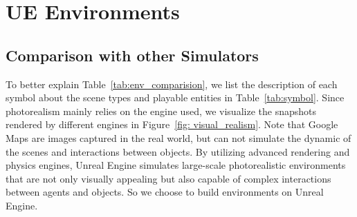 



\section{UE Environments}
\label{app:env}

\subsection{Comparison with other Simulators}
To better explain Table~\ref{tab:env_comparision}, we list the description of each symbol about the scene types and playable entities in Table~\ref{tab:symbol}. Since photorealism mainly relies on the engine used, we visualize the snapshots rendered by different engines in Figure~\ref{fig: visual_realism}. Note that Google Maps are images captured in the real world, but can not simulate the dynamic of the scenes and interactions between objects. By utilizing advanced rendering and physics engines, Unreal Engine simulates large-scale photorealistic environments that are not only visually appealing but also capable of complex interactions between agents and objects. So we choose to build environments on Unreal Engine.

